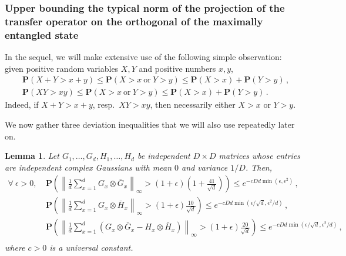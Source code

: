 \documentclass{amsart}
\newtheorem{lemma}[theorem]{Lemma}
\renewcommand{\P}{\mathbf{P}}
\renewcommand{\leq}{\leqslant}
\begin{document}
\subsubsection{Upper bounding the typical norm of the projection of the transfer operator on the orthogonal of the maximally entangled state} \hfill\par\smallskip

In the sequel, we will make extensive use of the following simple observation: given positive random variables $X,Y$ and positive numbers $x,y$,
\begin{align*}
     & \P(X+Y>x+y) \leq \P(X>x\ \text{or}\ Y>y) \leq \P(X>x) + \P(Y>y) \, , \\
     & \P(XY>xy) \leq \P(X>x\ \text{or}\ Y>y) \leq \P(X>x) + \P(Y>y) \, .
\end{align*}
Indeed, if $X+Y>x+y$, resp.~$XY>xy$, then necessarily either $X>x$ or $Y>y$.

We now gather three deviation inequalities that we will also use repeatedly later on.

\begin{lemma} \label{lem:dev-norms}
    Let $G_1,\ldots,G_d,H_1,\ldots,H_d$ be independent $D\times D$ matrices whose entries are independent complex Gaussians with mean $0$ and variance $1/D$. Then,
    \begin{align*}
        \forall\ \epsilon>0, & \ \P \left( \left\| \frac{1}{d}\sum_{x=1}^d G_x\otimes \bar{G}_x \right\|_{\infty} > (1+\epsilon)\left(1+\frac{41}{\sqrt{d}}\right) \right) \leq e^{-cDd\min(\epsilon,\epsilon^2)} \, ,                      \\
                             & \ \P \left( \left\| \frac{1}{d}\sum_{x=1}^d G_x\otimes \bar{H}_x \right\|_{\infty} > (1+\epsilon)\frac{10}{\sqrt{d}} \right) \leq e^{-cDd\min(\epsilon/\sqrt{d},\epsilon^2/d)} \, ,                          \\
                             & \ \P \left( \left\| \frac{1}{d}\sum_{x=1}^d (G_x\otimes \bar{G}_x - H_x\otimes \bar{H}_x) \right\|_{\infty} > (1+\epsilon)\frac{20}{\sqrt{d}} \right) \leq e^{-cDd\min(\epsilon/\sqrt{d},\epsilon^2/d)} \, , \\
    \end{align*}
    where $c>0$ is a universal constant.
\end{lemma}
\end{document}
